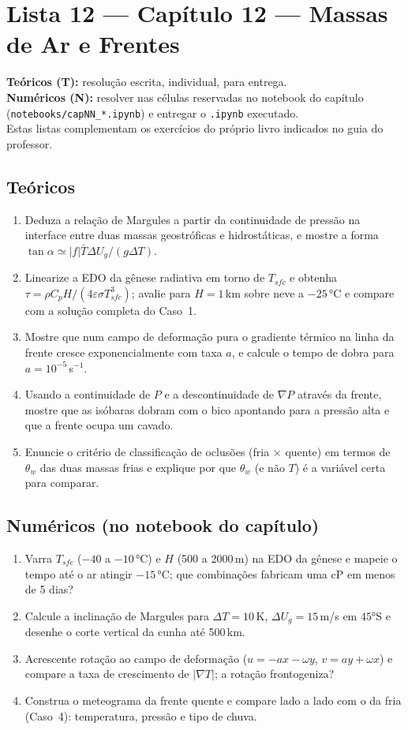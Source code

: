\documentclass[11pt]{article}
\newcommand{\instrucoes}{%
\begin{caixalista}
\textbf{Teóricos (T):} resolução escrita, individual, para entrega.\\
\textbf{Numéricos (N):} resolver nas células reservadas no notebook do
capítulo (\texttt{notebooks/capNN\_*.ipynb}) e entregar o
\texttt{.ipynb} executado.\\
Estas listas complementam os exercícios do próprio livro indicados no
guia do professor.
\end{caixalista}}
\begin{document}
\clearpage
\section*{Lista 12 --- Capítulo 12 --- Massas de Ar e Frentes}
\instrucoes

\subsection*{Teóricos}

\begin{enumerate}[label=\textbf{T\arabic*.},itemsep=4pt]
  \item Deduza a relação de Margules a partir da continuidade de
        pressão na interface entre duas massas geostróficas e
        hidrostáticas, e mostre a forma
        $\tan\alpha \simeq |f|\bar T\Delta U_g/(g\Delta T)$.
  \item Linearize a EDO da gênese radiativa em torno de $T_{sfc}$ e
        obtenha $\tau = \rho C_p H/(4\varepsilon\sigma T_{sfc}^3)$;
        avalie para $H = 1$\,km sobre neve a $-25\,°$C e compare com a
        solução completa do Caso~1.
  \item Mostre que num campo de deformação pura o gradiente térmico na
        linha da frente cresce exponencialmente com taxa $a$, e calcule
        o tempo de dobra para $a = 10^{-5}$\,s$^{-1}$.
  \item Usando a continuidade de $P$ e a descontinuidade de $\nabla P$
        através da frente, mostre que as isóbaras dobram com o bico
        apontando para a pressão alta e que a frente ocupa um cavado.
  \item Enuncie o critério de classificação de oclusões (fria × quente)
        em termos de $\theta_w$ das duas massas frias e explique por
        que $\theta_w$ (e não $T$) é a variável certa para comparar.
\end{enumerate}

\subsection*{Numéricos (no notebook do capítulo)}

\begin{enumerate}[label=\textbf{N\arabic*.},itemsep=4pt]
  \item Varra $T_{sfc}$ ($-40$ a $-10\,°$C) e $H$ (500 a 2000\,m) na
        EDO da gênese e mapeie o tempo até o ar atingir $-15\,°$C; que
        combinações fabricam uma cP em menos de 5 dias?
  \item Calcule a inclinação de Margules para $\Delta T = 10$\,K,
        $\Delta U_g = 15$\,m/s em $45°$S e desenhe o corte vertical da
        cunha até 500\,km.
  \item Acrescente rotação ao campo de deformação
        ($u = -ax-\omega y$, $v = ay+\omega x$) e compare a taxa de
        crescimento de $|\nabla T|$; a rotação frontogeniza?
  \item Construa o meteograma da frente quente e compare lado a lado
        com o da fria (Caso~4): temperatura, pressão e tipo de chuva.
\end{enumerate}
\end{document}
